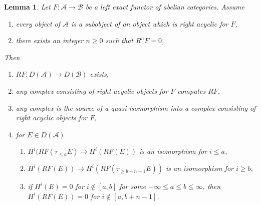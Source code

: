 \documentclass{amsart}
\theoremstyle{plain}
\newtheorem{lemma}[subsection]{Lemma}
\theoremstyle{definition}
\theoremstyle{remark}
\numberwithin{equation}{subsection}
\begin{document}
\begin{lemma}
\label{lemma-unbounded-right-derived}
Let $F : \mathcal{A} \to \mathcal{B}$ be a left exact functor of
abelian categories. Assume
\begin{enumerate}
\item every object of $\mathcal{A}$ is a subobject of an object
which is right acyclic for $F$,
\item there exists an integer $n \geq 0$ such that $R^nF = 0$,
\end{enumerate}
Then
\begin{enumerate}
\item $RF : D(\mathcal{A}) \to D(\mathcal{B})$ exists,
\item any complex consisting of right acyclic objects for $F$ computes $RF$,
\item any complex is the source of a quasi-isomorphism into a complex
consisting of right acyclic objects for $F$,
\item for $E \in D(\mathcal{A})$
\begin{enumerate}
\item $H^i(RF(\tau_{\leq a}E) \to H^i(RF(E))$ is an isomorphism
for $i \leq a$,
\item $H^i(RF(E)) \to H^i(RF(\tau_{\geq b - n + 1}E))$ is an isomorphism
for $i \geq b$,
\item if $H^i(E) = 0$ for $i \not \in [a, b]$ for some
$-\infty \leq a \leq b \leq \infty$, then $H^i(RF(E)) = 0$
for $i \not \in [a, b + n - 1]$.
\end{enumerate}
\end{enumerate}
\end{lemma}
\end{document}
